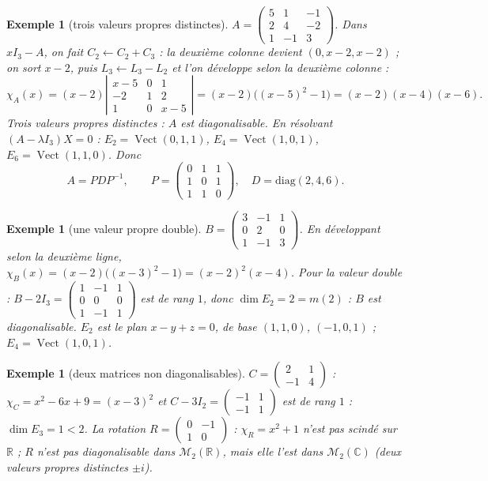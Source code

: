 \documentclass[a4paper,11pt]{article}
\numberwithin{equation}{section}
\numberwithin{figure}{section}
\numberwithin{table}{section}
\theoremstyle{enonce}
\theoremstyle{exemple}
\newtheorem{exemple}[definition]{Exemple}
\theoremstyle{remarque}
\newcommand{\R}{\mathbb{R}}
\newcommand{\C}{\mathbb{C}}
\newcommand{\vect}{\operatorname{Vect}}
\newcommand{\dt}[1]{\left|\begin{matrix}#1\end{matrix}\right|}
\begin{document}
\begin{exemple}[trois valeurs propres distinctes]\label{ex:diag1}
$A=\begin{pmatrix}5&1&-1\\2&4&-2\\1&-1&3\end{pmatrix}$. Dans $xI_3-A$, on fait $C_2\leftarrow C_2+C_3$ : la deuxième colonne devient
$(0,x-2,x-2)$ ; on sort $x-2$, puis $L_3\leftarrow L_3-L_2$ et l'on développe selon la deuxième colonne :
\[\chi_A(x)=(x-2)\dt{x-5&0&1\\-2&1&2\\1&0&x-5}=(x-2)\big((x-5)^2-1\big)=(x-2)(x-4)(x-6).\]
Trois valeurs propres distinctes : $A$ est diagonalisable. En résolvant $(A-\lambda I_3)X=0$ :
$E_2=\vect(0,1,1)$, $E_4=\vect(1,0,1)$, $E_6=\vect(1,1,0)$. Donc
\[A=PDP^{-1},\qquad P=\begin{pmatrix}0&1&1\\1&0&1\\1&1&0\end{pmatrix},\quad D=\mathrm{diag}(2,4,6).\]
\end{exemple}

\begin{exemple}[une valeur propre double]\label{ex:diag2}
$B=\begin{pmatrix}3&-1&1\\0&2&0\\1&-1&3\end{pmatrix}$. En développant selon la deuxième ligne,
$\chi_B(x)=(x-2)\big((x-3)^2-1\big)=(x-2)^2(x-4)$. Pour la valeur double : $B-2I_3=\begin{pmatrix}1&-1&1\\0&0&0\\1&-1&1\end{pmatrix}$
est de rang $1$, donc $\dim E_2=2=m(2)$ : $B$ est diagonalisable. $E_2$ est le plan $x-y+z=0$, de base $(1,1,0)$, $(-1,0,1)$ ;
$E_4=\vect(1,0,1)$.
\end{exemple}

\begin{exemple}[deux matrices non diagonalisables]
$C=\begin{pmatrix}2&1\\-1&4\end{pmatrix}$ : $\chi_C=x^2-6x+9=(x-3)^2$ et $C-3I_2=\begin{pmatrix}-1&1\\-1&1\end{pmatrix}$ est de rang $1$ :
$\dim E_3=1<2$. La rotation $R=\begin{pmatrix}0&-1\\1&0\end{pmatrix}$ : $\chi_R=x^2+1$ n'est pas scindé sur $\R$ ; $R$ n'est pas
diagonalisable dans $\mathcal M_2(\R)$, mais elle l'est dans $\mathcal M_2(\C)$ (deux valeurs propres distinctes $\pm i$).
\end{exemple}
\end{document}
